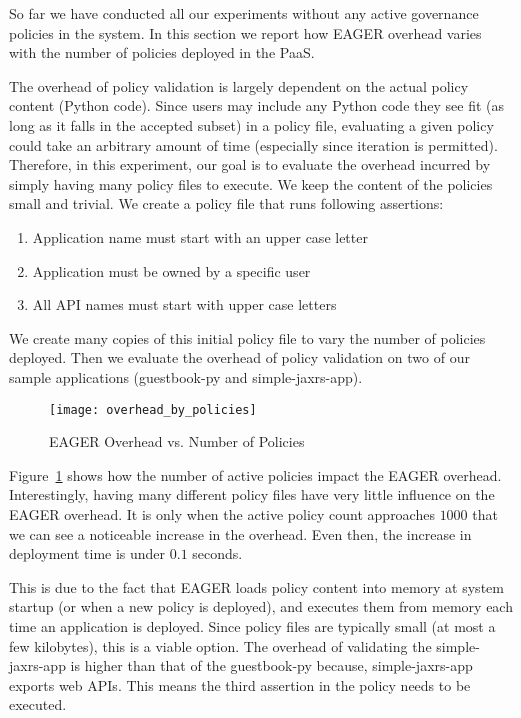 So far we have conducted all our experiments without any active governance policies in the system. In this section we report how EAGER overhead
varies with the number of policies deployed in the PaaS. 

The overhead of policy validation is largely dependent on the actual policy
content (Python code). Since users may include any Python code they see fit
(as long as it falls in the accepted subset) in a policy file, evaluating a
given policy could take an arbitrary amount of time (especially since
iteration is permitted). Therefore, in this
experiment, our goal is to evaluate the overhead incurred by simply having
many policy files to execute. We keep the content of the policies small and
trivial. We create a policy file that runs following assertions:
\begin{enumerate} 
\item Application name must start with an upper case letter
\item Application must be owned by a specific user 
\item All API names must start with upper case letters 
\end{enumerate} We create many copies of this
initial policy file to vary the number of policies deployed. Then we evaluate
the overhead of policy validation on two of our sample applications
(guestbook-py and simple-jaxrs-app). 

\begin{figure}
\centering
\texttt{[image: overhead\_by\_policies]}
\vspace{-0.01in}
\caption{EAGER Overhead vs. Number of Policies}
\label{fig:overhead_by_policies}
\end{figure}

Figure~\ref{fig:overhead_by_policies} shows how the number of active policies
impact the EAGER overhead. Interestingly, having many different policy files
have very little influence on the EAGER overhead. It is only when the active
policy count approaches $1000$ that we can see a noticeable increase in the
overhead. Even then, the increase in deployment time is under $0.1$ seconds. 

This is due to the fact that EAGER loads policy content into memory at system
startup (or when a new policy is deployed), and executes them from memory each
time an application is deployed. Since policy files are typically small (at
most a few kilobytes), this is a viable option. The overhead of validating the
simple-jaxrs-app is higher than that of the guestbook-py because,
simple-jaxrs-app exports web APIs. This means the third assertion in the
policy needs to be executed. 

